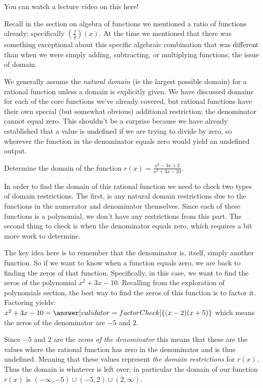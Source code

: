 \documentclass{ximera}
\begin{document}
You can watch a lecture video on this here!


Recall in the section on algebra of functions we mentioned a ratio of functions already; specifically $\left(\frac{f}{g}\right)(x)$. At the time we mentioned that there was something exceptional about this specific algebraic combination that was different than when we were simply adding, subtracting, or multiplying functions; the issue of domain.

We generally assume the \textit{natural domain} (ie the largest possible domain) for a rational function unless a domain is explicitly given. We have discussed domains for each of the core functions we've already covered, but rational functions have their own special (but somewhat obvious) additional restriction; the denominator cannot equal zero. This shouldn't be a surprise because we have already established that a value is undefined if we are trying to divide by zero, so wherever the function in the denominator equals zero would yield an undefined output. 

\begin{example}
    Determine the domain of the function $r(x) = \frac{x^2 - 3x + 2}{x^2 + 3x - 10}$. 
    
    In order to find the domain of this rational function we need to check two types of domain restrictions. The first, is any natural domain restrictions due to the functions in the numerator and denominator themselves. Since each of these functions is a polynomial, we don't have any restrictions from this part. The second thing to check is when the denominator equals zero, which requires a bit more work to determine.
    
    The key idea here is to remember that the denominator is, itself, simply another function. So if we want to know when a function equals zero, we are back to finding the zeros of that function. Specifically, in this case, we want to find the zeros of the polynomial $x^2 +3x - 10$. Recalling from the exploration of polynomials section, the best way to find the zeros of this function is to factor it. Factoring yields: $x^2 + 3x - 10 = \answer[validator=factorCheck]{(x-2)(x+5)}$ which means the zeros of the denominator are $-5$ and $2$.
    
    Since $-5$ and $2$ are the \textit{zeros of the denominator} this means that these are the values where the rational function has zero in the denominator and is thus undefined. Meaning that these values represent \textit{the domain restrictions} for $r(x)$. Thus the domain is whatever is left over; in particular the domain of our function $r(x)$ is $(-\infty,-5)\cup(-5,2)\cup(2,\infty)$.
\end{example}
\end{document}
